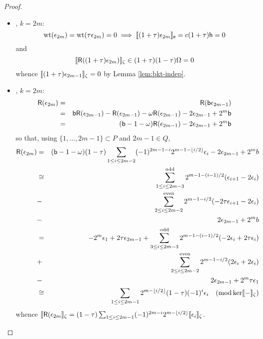 \begin{proof}
\begin{itemize}
\item\textbf{\claimB}, $k = 2m$:
\[
        \operatorname{\mathrm{wt}}(\epsilon_{2m}) = \operatorname{\mathrm{wt}}(\tau \epsilon_{2m}) = 0 \implies \llbracket{(1+\tau) \epsilon_{2m}}\rrbracket_{\mathsf{e}} = c (1+\tau)\mathsf{h} = 0
\]
and
\[
        \llbracket{\mathsf{R}((1+\tau) \epsilon_{2m})}\rrbracket_\zeta \in (1 + \tau)(1 - \tau) \Omega = 0
\]
whence $\llbracket{(1+\tau) \epsilon_{2m-1}}\rrbracket_\zeta = 0$ by Lemma \ref{lem:bkt-indep}.

\item\textbf{\claimA}, $k = 2m$:
\begin{eqnarray*}
        \mathsf{R}(\epsilon_{2m}) &=& \mathsf{R}(\mathsf{b} \epsilon_{2m-1})     
                        \\&=& \mathsf{b} \mathsf{R}(\epsilon_{2m-1}) - \mathsf{R}(\epsilon_{2m-1}) - \omega \mathsf{R}(\epsilon_{2m-1}) - 2 \epsilon_{2m-1} + 2^m \mathsf{b} 
                        \\&=& (\mathsf{b} - 1 - \omega) \mathsf{R}(\epsilon_{2m-1}) - 2 \epsilon_{2m-1} + 2^m \mathsf{b}
\end{eqnarray*}
so that, using $\{1,\dots,2m-1\} \subset P$ and $2m-1 \in Q$,
\begin{eqnarray*}
        \mathsf{R}(\epsilon_{2m}) &=& (\mathsf{b} - 1 - \omega) (1 - \tau) \sum_{1 \le i \le 2m-2} (-1)^{2m-1-i} 2^{m-1 - \lfloor i/2\rfloor} \epsilon_i - 2 \epsilon_{2m-1} + 2^m b
                        \\&\cong& \sum_{1 \le i \le 2m-3}^{\mathrm{odd}}  2^{m-1 - (i-1)/2} (\epsilon_{i+1} - 2\epsilon_i) 
                        \\&-& \sum_{2 \le i \le 2m-2}^{\mathrm{even}} 2^{m-1 - i/2} (-2\tau\epsilon_{i+1} - 2\epsilon_i) 
                        \\&-& 2 \epsilon_{2m-1} + 2^m b \\
                          &=& -2^m \epsilon_1 + 2\tau\epsilon_{2m-1} + \sum_{3 \le i \le 2m-3}^{\mathrm{odd}}  2^{m-1 - (i-1)/2} (-2\epsilon_i+2\tau\epsilon_i) 
                        \\&+& \sum_{2 \le i \le 2m-2}^{\mathrm{even}} 2^{m-1 - i/2} (2\epsilon_i + 2\epsilon_i) 
                        \\&-& 2 \epsilon_{2m-1} + 2^m \tau\epsilon_1
                        \\&\cong& \sum_{1 \le i \le 2m-1} 2^{m - \lfloor i/2\rfloor} (1 - \tau) (-1)^i \epsilon_i\quad (\operatorname{\mathrm{mod}} \ker \llbracket{-}\rrbracket_\zeta)
\end{eqnarray*}
whence $\llbracket{\mathsf{R}(\epsilon_{2m}}\rrbracket_\zeta = (1-\tau) \sum_{1\le i\le 2m-1} (-1)^{2m-i} 2^{m - \lfloor i/2\rfloor} \llbracket{\epsilon_i}\rrbracket_\zeta$.


\end{itemize}
\end{proof}
